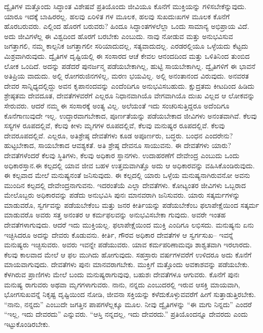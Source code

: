 ದ್ವೈತಿಗಳ ಮತ್ತೊಂದು ಸಿದ್ಧಾಂತ ವಿಶೇಷವೆ ಪ್ರತಿಯೊಂದು ಜೀವಿಯೂ ಕೊನೆಗೆ ಮುಕ್ತಿಯನ್ನು ಗಳಿಸಬೇಕೆನ್ನುವುದು. ಯಾರೂ ಇದಕ್ಕೆ ಬಾಹಿರರಲ್ಲ. ಹಲವು ಏರಿಳಿತ ಗಳ ಮೂಲಕ, ಹಲವು ಸುಖದುಃಖಗಳ ಮೂಲಕ ಕೊನೆಗೆ ಹೊರಬರುವರು. ಎಲ್ಲಿಂದ ಹೊರಗೆ ಬರುವರು? ಹಿಂದೂ ಸಿದ್ಧಾಂತಗಳಲೆಲ್ಲಾ ಒಂದು ಸಾಮಾನ್ಯ ಅಭಿಪ್ರಾಯ ವಿದೆ. ಅದು ಜೀವಿಗಳೆಲ್ಲ ಈ ವಿಶ್ವದಿಂದ ಹೊರಗೆ ಬರಬೇಕು ಎಂಬುದು. ನಾವು ನೋಡುವ ಮತ್ತು ಅನುಭವಿಸುವ ಜಗತ್ತಾಗಲಿ, ನಮ್ಮ ಕಾಲ್ಪನಿಕ ಜಗತ್ತಾಗಲೀ ಸರಿಯಾದುದಲ್ಲ, ಸತ್ಯವಾದುದಲ್ಲ. ಎರಡರಲ್ಲಿಯೂ ಒಳ್ಳೆಯದು ಕೆಟ್ಟದು ಮಿಶ್ರವಾಗಿರುವುದು. ದ್ವೈತಿಗಳ ದೃಷ್ಟಿಯಲ್ಲಿ ಈ ಸಂಸಾರದ ಆಚೆ ಕೇವಲ ಆನಂದದಿಂದ ಮತ್ತು ಒಳಿತಿನಿಂದ ತುಂಬಿದ ಲೋಕ ಒಂದಿದೆ. ಅದನ್ನು ಪಡೆದರೆ ಪುನರ್ಜನ್ಮ ಪಡೆಯಬೇಕಾಗಿಲ್ಲ, ಹುಟ್ಟಿ ಸಾಯಬೇಕಾಗಿಲ್ಲ. ದ್ವೈತಿಗಳಿಗೆ ಈ ಭಾವನೆ ಅತಿಪ್ರಿಯ ವಾದುದು. ಅಲ್ಲಿ ರೋಗರುಜಿನಗಳಿಲ್ಲ, ಮರಣ ಭಯವಿಲ್ಲ. ಅಲ್ಲಿ ಅನಂತಾನಂದ ವಿರುವುದು. ಅನವರತ ದೇವರ ಸಾನ್ನಿಧ್ಯದಲ್ಲಿದ್ದು ಅವನ ಕೃಪಾನಂದವನ್ನು ಎಂದೆಂದಿಗೂ ಅನುಭವಿಸಬಹುದು. ಕ್ಷುದ್ರತಮ ಕೀಟದಿಂದ ಹಿಡಿದು ಶ್ರೇಷ್ಠತಮ ದೇವದೂತ, ದೇವತೆಗಳವರೆಗೆ ಎಲ್ಲರೂ ನಿಧಾನವಾಗಿಯೊ ವೇಗವಾಗಿಯೊ ದುಃಖ ವಿಲ್ಲದ ಆ ಲೋಕವನ್ನು ಸೇರುವರು. ಆದರೆ ನಮ್ಮ ಈ ಸಂಸಾರಕ್ಕೆ ಅಂತ್ಯ ವಿಲ್ಲ. ಅಲೆಯಂತೆ ಇದು ಸಂಚರಿಸುತ್ತಿದ್ದರೂ ಅದೆಂದಿಗೂ ಕೊನೆಗಾಣುವುದೇ ಇಲ್ಲ. ಉದ್ಧಾರವಾಗಬೇಕಾದ, ಪೂರ್ಣತೆಯನ್ನು ಪಡೆಯಬೇಕಾದ ಜೀವಿಗಳು ಅನಂತವಾಗಿವೆ. ಕೆಲವು ಸಸ್ಯಗಳ ರೂಪದಲ್ಲಿವೆ, ಕೆಲವು ಕೀಳು ಮೃಗಗಳ ರೂಪದಲ್ಲಿವೆ, ಕೆಲವು ಮನುಷ್ಯರ ರೂಪದಲ್ಲಿವೆ. ಕೆಲವು ದೇವರೂಪದಲ್ಲಿವೆ. ಎಲ್ಲರೂ, ಅತಿಶ್ರೇಷ್ಠ ದೇವತೆಗಳು ಕೂಡ ಅಪೂರ್ಣರು, ಬದ್ಧರು. ಬಂಧನ ಎಂದರೇನು? ಹುಟ್ಟಬೇಕಾದ, ಸಾಯಬೇಕಾದ ಆವಶ್ಯಕತೆ. ಅತಿ ಶ್ರೇಷ್ಠ ದೇವನೂ ಸಾಯುವನು. ಈ ದೇವತೆಗಳು ಯಾರು? ದೇವತೆಗಳೆಂದರೆ ಕೆಲವು ಸ್ಥಿತಿಗಳು, ಕೆಲವು ಅಧಿಕಾರ ಸ್ಥಾನಗಳು. ಉದಾಹರಣೆಗೆ ದೇವೇಂದ್ರ ಎಂಬುದು ಒಂದು ಅಧಿಕಾರಸ್ತಾನ.ಈ ಕಲ್ಪದಲ್ಲಿ ಯಾವ ಜೀವ ಬಹಳ ಉತ್ತಮವಾಗಿತ್ತೊ ಅದು ಆ ಅಧಿಕಾರವನ್ನು ವಹಿಸಿಕೊಂಡಿರುವುದು. ಈ ಕಲ್ಪವಾದ ಮೇಲೆ ಮನುಷ್ಯನಂತೆ ಜನಿಸುವುದು. ಈ ಕಲ್ಪದಲ್ಲಿ ಯಾರು ಒಳ್ಳೆಯ ಮನುಷ್ಯನಾಗಿರುವನೋ ಅವನು ಮುಂದಿನ ಕಲ್ಪದಲ್ಲಿ ದೇವೇಂದ್ರನಾಗುವನು. ಇದರಂತೆಯೆ ಎಲ್ಲಾ ದೇವತೆಗಳು. ಕೋಟ್ಯಂತರ ಜೀವಿಗಳು ಒಬ್ಬರಾದ ಮೇಲೊಬ್ಬರು ಅಧಿಕಾರವನ್ನು ಪಡೆದು ಅನುಭವಿಸಿ ಪುನಃ ಮಾನವರಾಗಿ ಜನಿಸುವರು. ಯಾರು ಸತ್ಕರ್ಮಗಳನ್ನು ಮಾಡುವರೊ, ಸ್ವರ್ಗವನ್ನು ಪಡೆಯಬೇಕೆಂಬ ಮತ್ತು ಜನರ ಕೀರ್ತಿಯನ್ನು ಪಡೆಯಬೇಕೆಂಬ ಫಲಾಪೇಕ್ಷೆಯಿಂದ ಸತ್ಕರ್ಮ ಮಾಡುವರೊ ಅವರು ಸತ್ತ ಅನಂತರ ಆ ಕರ್ಮಫಲವನ್ನು ಅನುಭವಿಸಬೇಕಾ ಗುವುದು. ಅವರೇ ಇಂತಹ ದೇವತೆಗಳಾಗುವುದು. ಆದರೆ ಇದು ಮುಕ್ತಿಯಲ್ಲ. ಫಲಾಪೇಕ್ಷೆಯಿಂದ ಮುಕ್ತಿ ಎಂದಿಗೂ ಲಭಿಸದು. ಮನುಷ್ಯನು ಏನು ಇಚ್ಛಿಸಿದರೂ ಅದನ್ನು ದೇವರು ಕೊಡುವನು. ಕೀರ್ತಿ, ಗೌರವ ಅಧಿಕಾರ ದೇವತೆಗಳ ಆ ಸ್ವರ್ಗಸುಖ– ಇವನ್ನೆ ಮನುಷ್ಯರು ಇಚ್ಛಿಸುವರು. ಅವರು ಇವನ್ನೇ ಪಡೆಯುವರು. ಯಾವ ಕರ್ಮಪರಿಣಾಮವೂ ಶಾಶ್ವತವಾಗಿ ಇರಲಾರದು. ಕೆಲವು ಕಾಲವಾದ ಮೇಲೆ ಆ ಫಲ ಮುಗಿದು ಹೋಗುವುದು. ಸಹಸ್ರಾರು ವರ್ಷಗಳವರೆಗೆ ಉಳಿದರೂ ಅದು ಕೊನೆಗೆ ಮಾಯವಾಗುವುದು. ದೇವತೆಗಳು ಪುನಃ ಮಾನವರಾಗಬೇಕು. ಮುಕ್ತಿಗೆ ಮತ್ತೊಂದು ಅವಕಾಶವನ್ನು ಪಡೆಯಬೇಕು. ಕೆಳಗಿರುವ ಪ್ರಾಣಿಗಳು ಮೇಲೆ ಬಂದು ಮನುಷ್ಯರಾಗುವುವು, ಬಹುಶಃ ದೇವತೆಗಳೂ ಆಗುವರು. ಕೊನೆಗೆ ಪುನಃ ಮನುಷ್ಯ ರಾಗುವರು ಅಥವಾ ಮೃಗಗಳಾಗುವರು. ನಾನು, ನನ್ನದು ಎಂಬುದರಲ್ಲಿ ಇರುವ ಆಸಕ್ತಿ ಮಾಯವಾಗಿ, ಭೋಗಸುಖವನ್ನೆ ನಿಕೃಷ್ಟ ದೃಷ್ಟಿಯಿಂದ ನೋಡಿ, ಜೀವನಾ ಸಕ್ತಿಯನ್ನು ಕಳೆದುಕೊಳ್ಳುವವರೆಗೆ ಹೀಗೆ ಸುತ್ತಾಡುತ್ತಿರಬೇಕು. “ನಾನು, ನನ್ನದು” ಎಂಬುದೇ ಜಗತ್ತಿನ ಪಾಪಗಳೆಲ್ಲಕ್ಕೂ ಮೂಲ. ನೀವು ದ್ವೈತಿಗಳನ್ನು “ಈ ಮಗು ನಿನ್ನದು” ಎಂದರೆ “ಇಲ್ಲ, ಇದು ದೇವರದು” ಎನ್ನುವರು. “ಆಸ್ತಿ ನನ್ನದಲ್ಲ, ಇದು ದೇವರದು.” ಪ್ರತಿಯೊಂದನ್ನೂ ದೇವರದು ಎಂದು ಇಟ್ಟುಕೊಂಡಿರಬೇಕು.

